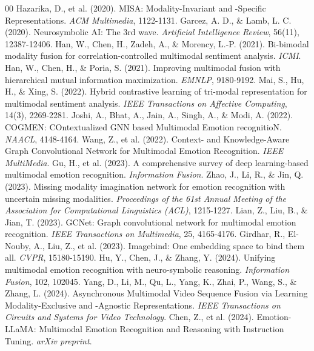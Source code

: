 \documentclass[sn-mathphys,Numbered]{sn-jnl}
\theoremstyle{thmstyleone}
\theoremstyle{thmstyletwo}
\theoremstyle{thmstylethree}
\begin{document}
\begin{thebibliography}{00}
 Hazarika, D., et al. (2020). MISA: Modality-Invariant and -Specific Representations. \textit{ACM Multimedia}, 1122-1131.
 Garcez, A. D., \& Lamb, L. C. (2020). Neurosymbolic AI: The 3rd wave. \textit{Artificial Intelligence Review}, 56(11), 12387-12406.
 Han, W., Chen, H., Zadeh, A., \& Morency, L.-P. (2021). Bi-bimodal modality fusion for correlation-controlled multimodal sentiment analysis. \textit{ICMI}.
 Han, W., Chen, H., \& Poria, S. (2021). Improving multimodal fusion with hierarchical mutual information maximization. \textit{EMNLP}, 9180-9192.
 Mai, S., Hu, H., \& Xing, S. (2022). Hybrid contrastive learning of tri-modal representation for multimodal sentiment analysis. \textit{IEEE Transactions on Affective Computing}, 14(3), 2269-2281.
 Joshi, A., Bhat, A., Jain, A., Singh, A., \& Modi, A. (2022). COGMEN: COntextualized GNN based Multimodal Emotion recognitioN. \textit{NAACL}, 4148-4164.
 Wang, Z., et al. (2022). Context- and Knowledge-Aware Graph Convolutional Network for Multimodal Emotion Recognition. \textit{IEEE MultiMedia}.
 Gu, H., et al. (2023). A comprehensive survey of deep learning-based multimodal emotion recognition. \textit{Information Fusion}.
 Zhao, J., Li, R., \& Jin, Q. (2023). Missing modality imagination network for emotion recognition with uncertain missing modalities. \textit{Proceedings of the 61st Annual Meeting of the Association for Computational Linguistics (ACL)}, 1215-1227.
 Lian, Z., Liu, B., \& Jian, T. (2023). GCNet: Graph convolutional network for multimodal emotion recognition. \textit{IEEE Transactions on Multimedia}, 25, 4165-4176.
 Girdhar, R., El-Nouby, A., Liu, Z., et al. (2023). Imagebind: One embedding space to bind them all. \textit{CVPR}, 15180-15190.
 Hu, Y., Chen, J., \& Zhang, Y. (2024). Unifying multimodal emotion recognition with neuro-symbolic reasoning. \textit{Information Fusion}, 102, 102045.
 Yang, D., Li, M., Qu, L., Yang, K., Zhai, P., Wang, S., \& Zhang, L. (2024). Asynchronous Multimodal Video Sequence Fusion via Learning Modality-Exclusive and -Agnostic Representations. \textit{IEEE Transactions on Circuits and Systems for Video Technology}.
 Chen, Z., et al. (2024). Emotion-LLaMA: Multimodal Emotion Recognition and Reasoning with Instruction Tuning. \textit{arXiv preprint}.

\end{thebibliography}
\end{document}
